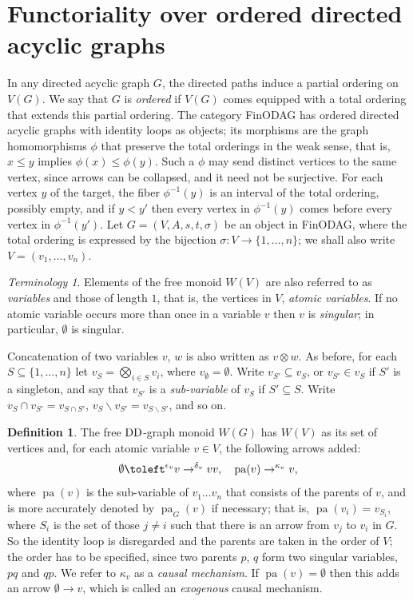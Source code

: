 \documentclass[12pt]{amsart}
\theoremstyle{plain}
\theoremstyle{definition}
\newtheorem{defn}[thm]{Definition}
\theoremstyle{remark}
\newtheorem{ter}[thm]{Terminology}
\numberwithin{equation}{section}
\theoremstyle{plain}
\newcommand{\0}{\emptyset}
\newcommand{\fun}{\longrightarrow}
\newcommand{\sub}{\subseteq}
\newcommand{\mi}{\smallsetminus}
\newcommand{\cat}[1]{\textup{\textsf{#1}}}
\DeclareMathOperator{\pa}{pa}
\newcommand{\memph}[1]{{\color{magenta}\emph{#1}}}
\newcommand{\DD}{\textup{DD}}
\begin{document}
\section{Functoriality over ordered directed acyclic graphs}


In any directed acyclic graph $G$, the directed paths induce a partial ordering on $V(G)$. We say that $G$ is \memph{ordered} if $V(G)$ comes equipped with a total ordering that extends this partial ordering. The category \cat{FinODAG} has ordered directed acyclic graphs with identity loops as objects; its morphisms are the graph homomorphisms $\phi$ that preserve the total orderings in the weak sense, that is, $x \leq y$ implies $\phi(x) \leq \phi(y)$. Such a $\phi$ may send distinct vertices to the same vertex, since arrows can be collapsed, and it need not be surjective. For each vertex $y$ of the target, the fiber $\phi^{-1}(y)$ is an interval of the total ordering, possibly empty, and if $y < y'$ then every vertex in $\phi^{-1}(y)$ comes before every vertex in $\phi^{-1}(y')$. Let $G = (V, A, s, t, \sigma)$ be an object in \cat{FinODAG}, where the total ordering is expressed by the bijection $\sigma: V \fun \{1, \ldots, n\}$; we shall also write $V = (v_1, \ldots, v_n)$.


\begin{ter}\label{graph:bas}
Elements of the free monoid $W(V)$ are also referred to as \memph{variables}  and those of length $1$, that is, the vertices in $V$,  \memph{atomic variables}. If no atomic variable occurs more than once in a variable $v$ then $v$ is \memph{singular}; in particular, $\0$ is singular.


Concatenation of two variables $v$, $w$ is also written as $v \otimes w$. As before, for each  $S \sub \{1, \ldots, n\}$ let $v_S = \bigotimes_{i \in S} v_i$, where $v_\0 = \0$. Write $v_{S'} \sub v_S$, or $v_{S'} \in v_S$ if  $S'$ is a singleton, and say that $v_{S'}$ is a \memph{sub-variable} of $v_S$ if  $S' \sub S$.  Write $v_{S} \cap v_{S'} = v_{S \cap S'}$, $v_S \mi v_{S'} = v_{S \mi S'}$, and so on.
\end{ter}




\begin{defn}\label{cau:gen}
The free $\DD$-graph monoid \memph{$W(G)$} has $W(V)$ as its set of vertices and, for each atomic variable $v \in V$, the following  arrows added:
\[
 \0 \toleft^{\epsilon_v} v \to^{\delta_v} vv, \quad \pa(v) \to^{\kappa_v} v,
\]
where $\pa(v)$ is the sub-variable of $v_1 \ldots v_n$ that consists of the parents of $v$, and is more accurately denoted by $\pa_G(v)$ if necessary; that is, $\pa(v_i) = v_{S_i}$, where $S_i$ is the set of those $j \neq i$ such that there is an arrow from $v_j$ to $v_i$ in $G$. So the identity loop is disregarded and the parents are taken in the order of $V$; the order has to be specified, since two parents $p$, $q$ form two singular variables, $pq$ and $qp$. We refer to $\kappa_v$ as a \memph{causal mechanism}. If $\pa(v) = \0$ then this adds an arrow $\0 \fun v$, which is called an \memph{exogenous} causal mechanism.
\end{defn}
\end{document}
